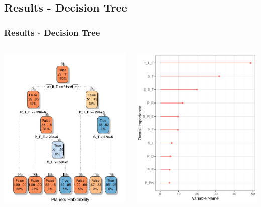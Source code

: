 \documentclass[compress]{beamer}
\begin{document}
\subsection{Results - Decision Tree}
\begin{frame}
\frametitle{Results - Decision Tree}
\begin{columns}
\begin{center}
\includegraphics[width=0.8\linewidth]{Pic/DecisionTree.pdf}
\end{center}
\begin{center}
\includegraphics[width=0.5\linewidth]{Pic/Var_imp_dec_tree.pdf}

\end{center}
\end{columns}
\end{frame}
\end{document}
